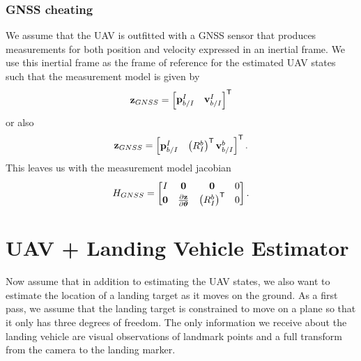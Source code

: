 \documentclass[a4paper]{article}
\begin{document}
\subsubsection{GNSS cheating}
We assume that the UAV is outfitted with a GNSS sensor that produces
measurements for both position and velocity expressed in an inertial frame. We
use this inertial frame as the frame of reference for the estimated UAV states
such that the measurement model is given by
\begin{equation}
  \boldsymbol{\mathrm{z}}_{GNSS} = 
  \begin{bmatrix}
    \boldsymbol{\mathrm{p}}_{b/I}^{I} & \boldsymbol{\mathrm{v}}_{b/I}^{I}
  \end{bmatrix}^{\mathsf{T}}
\end{equation}
or also
\begin{equation}
  \boldsymbol{\mathrm{z}}_{GNSS} = 
  \begin{bmatrix}
    \boldsymbol{\mathrm{p}}_{b/I}^{I} & \left(R_I^b\right)^{\mathsf{T}} \boldsymbol{\mathrm{v}}_{b/I}^{b}
  \end{bmatrix}^{\mathsf{T}}.
\end{equation}
This leaves us with the measurement model jacobian
\begin{equation}
  H_{GNSS} =
  \begin{bmatrix}
    I & \boldsymbol{\mathrm{0}} & \boldsymbol{\mathrm{0}} & 0 \\
    \boldsymbol{\mathrm{0}} & \frac{\partial \boldsymbol{\mathrm{z}}}{\partial \boldsymbol{\mathrm{\theta}}} & 
      \left(R_I^b\right)^{\mathsf{T}} & 0
  \end{bmatrix}.
\end{equation}

\section{UAV + Landing Vehicle Estimator}
Now assume that in addition to estimating the UAV states, we also want to
estimate the location of a landing target as it moves on the ground. As a first
pass, we assume that the landing target is constrained to move on a plane so
that it only has three degrees of freedom. The only information we receive about
the landing vehicle are visual observations of landmark points and a full
transform from the camera to the landing marker.
\end{document}
